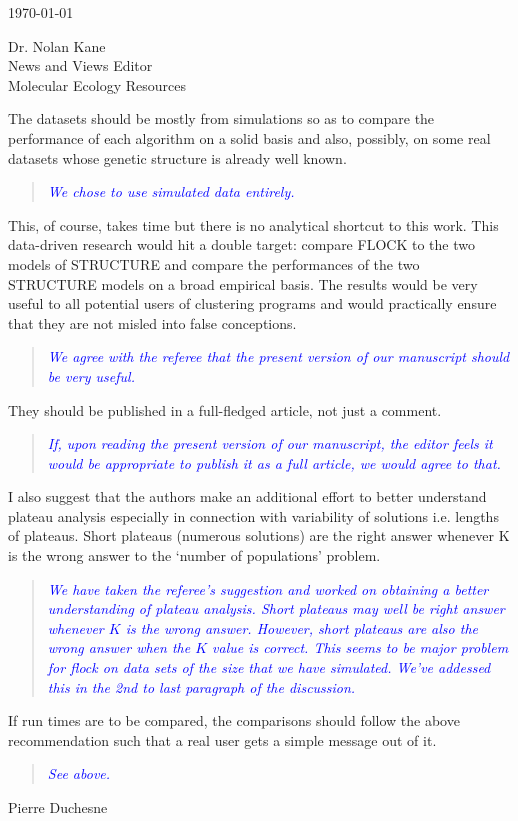 \documentclass[11pt]{letter}
\newcommand{\reply}[1]{\begin{quotation}\small\sl\textcolor{blue}{#1}\end{quotation}}
\begin{document}
\begin{letter}{ \today 

Dr. Nolan Kane\\
News and Views Editor\\
Molecular Ecology Resources \\
}
The datasets should be mostly
from simulations so as to compare the performance of each algorithm on a solid basis and also, possibly, on some real datasets whose genetic structure is already well known. 

\reply{We chose to use simulated data entirely.}

This, of course, takes time but there is no analytical shortcut to this work. This data-driven research would hit a double target: compare FLOCK to the two models of STRUCTURE and compare the performances of the two STRUCTURE models on a broad empirical basis. The results would be very useful to all potential users of clustering programs and would practically ensure that they are not misled into false conceptions. 

\reply{We agree with the referee that the present version of our manuscript should be very useful.}

They should be published in a full-fledged article, not just a comment. 

\reply{If, upon reading the present version of our manuscript, the editor feels it would be appropriate
to publish it as a full article, we would agree to that.
}


I also suggest that the authors make an additional effort to better understand plateau analysis especially in connection with variability of solutions i.e. lengths of plateaus. Short plateaus (numerous solutions) are the right answer whenever K is the wrong answer to the `number of populations' problem. 

\reply{We have taken the referee's suggestion and worked on obtaining a better understanding of plateau analysis.
Short plateaus may well be right answer whenever $K$ is the wrong answer.  However, short plateaus are also
the wrong answer when the $K$ value is correct.  This seems to be major problem for {\sc flock} on data sets
of the size that we have simulated.  We've addessed this in the 2nd to last paragraph of the discussion. }

If run times are to be compared, the comparisons should follow the above recommendation such that a real user gets a simple message out of it.

\reply{See above.}
Pierre Duchesne

\end{letter}

 
\end{document}
